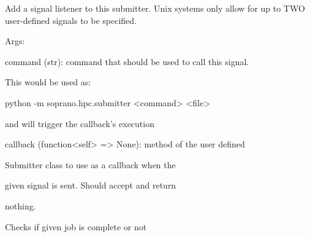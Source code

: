 \documentclass[letterpaper,10pt,english]{sphinxmanual}
\begin{document}
\begin{fulllineitems}
\begin{fulllineitems}
\label{doctree/soprano.hpc.submitter.submit:soprano.hpc.submitter.submit.Submitter.add_signal}
Add a signal listener to this submitter. Unix systems only allow
for up to TWO user-defined signals to be specified.

\begin{DUlineblock}{0em}
\item[] Args:
\item[]
\begin{DUlineblock}{\DUlineblockindent}
\item[] command (str): command that should be used to call this signal.
\item[]
\begin{DUlineblock}{\DUlineblockindent}
\item[] This would be used as:
\item[] python -m soprano.hpc.submitter \textless{}command\textgreater{} \textless{}file\textgreater{}
\item[] and will trigger the callback's execution
\end{DUlineblock}
\item[] callback (function\textless{}self\textgreater{} =\textgreater{} None): method of the user defined
\item[]
\begin{DUlineblock}{\DUlineblockindent}
\item[] Submitter class to use as a callback when the
\item[] given signal is sent. Should accept and return
\item[] nothing.
\end{DUlineblock}
\end{DUlineblock}
\end{DUlineblock}

\end{fulllineitems}


\begin{fulllineitems}
\label{doctree/soprano.hpc.submitter.submit:soprano.hpc.submitter.submit.Submitter.check_job}
Checks if given job is complete or not

\end{fulllineitems}


\end{fulllineitems}
\end{document}
